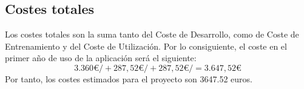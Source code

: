 \subsection{Costes totales}
Los costes totales son la suma tanto del Coste de Desarrollo, como de Coste de Entrenamiento y del Coste de Utilización. Por lo consiguiente, el coste en el primer año de uso de la aplicación será el siguiente: 
\\
\[3.360{\euro{}} /+287,52{\euro{}}/+287,52{\euro{}}/=3.647,52{\euro{}}\]
Por tanto, los costes estimados para el proyecto son 3647.52 euros. 